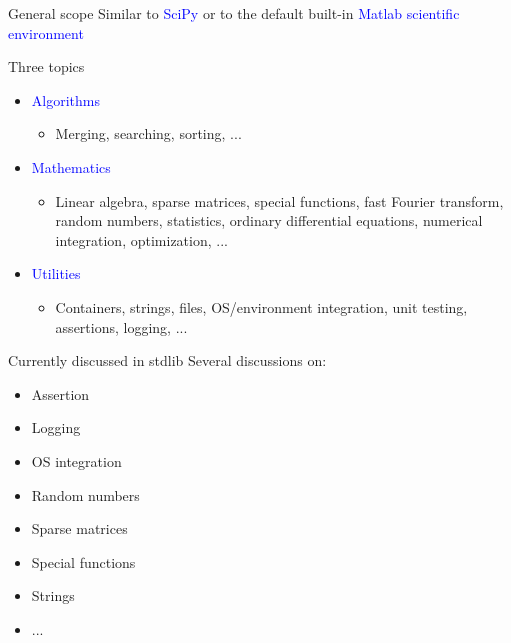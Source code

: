 \documentclass{beamer}
\begin{document}
\begin{frame}[t]{General scope}
	Similar to \textcolor{blue}{SciPy} or
	to the default built-in \textcolor{blue}{Matlab scientific environment}

        \textcolor{mygreen}{Three} topics
	\begin{itemize}
		\item \textcolor{blue}{Algorithms}
		\begin{itemize}
			\item Merging, searching, sorting, ...
		\end{itemize}
		\item \textcolor{blue}{Mathematics}
		\begin{itemize}
			\item Linear algebra, sparse matrices, special functions, fast Fourier transform, random numbers, statistics, ordinary differential equations, numerical integration, optimization, ...
		\end{itemize}
		\item \textcolor{blue}{Utilities}
		\begin{itemize}
			\item Containers, strings, files, OS/environment integration, unit testing, assertions, logging, ...
		\end{itemize}
	\end{itemize}
\end{frame}


\begin{frame}[c]{Currently discussed in stdlib}
	Several discussions on:
	\begin{itemize}
		\item Assertion
		\item Logging
		\item OS integration
		\item Random numbers
		\item Sparse matrices
		\item Special functions
		\item Strings
		\item ...
	\end{itemize}
\end{frame}
\end{document}
